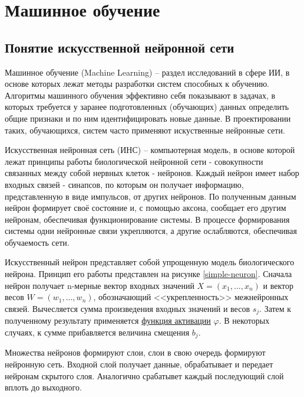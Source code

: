 \section{Машинное обучение}

\subsection{Понятие искусственной нейронной сети}

Машинное обучение (Machine Learning) – раздел исследований в сфере ИИ, в основе которых лежат методы разработки систем способных к обучению. Алгоритмы машинного обучения эффективно себя показывают в задачах, в которых требуется у заранее подготовленных (обучающих) данных определить общие признаки и по ним идентифицировать новые данные. В проектировании таких, обучающихся, систем часто применяют искуственные нейронные сети. 

Искусственная нейронная сеть (ИНС) – компьютерная модель, в основе которой лежат принципы работы биологической нейронной сети - совокупности связанных между собой нервных клеток - нейронов. Каждый нейрон имеет набор входных связей - синапсов, по которым он получает информацию, представленную в виде импульсов, от других нейронов. По полученным данным нейрон формирует своё состояние и, с помощью аксона, сообщает его другим нейронам, обеспечивая функционирование системы. В процессе формирования системы одни нейронные связи укрепляются, а другие ослабляются, обеспечивая обучаемость сети.

Искусственный нейрон представляет собой упрощенную модель биологического нейрона. Принцип его работы представлен на рисунке \ref{simple-neuron}. Сначала нейрон получает n-мерные вектор входных значений $X=(x_{1},...,x_{n})$ и вектор весов $W=(w_{1},...,w_{n})$, обозначающий <<укрепленность>> межнейронных связей. Вычесляется сумма произведения входных значений и весов $s_j$. Затем к полученному результату применяется \hyperref[sec:activation]{функция активации} $\varphi$. В некоторых случаях, к сумме прибавляется величина смещения $b_j$.


Множества нейронов формируют слои, слои в свою очередь формируют нейронную сеть. Входной слой получает данные, обрабатывает и передает нейронам скрытого слоя. Аналогично срабатывет каждый последующий слой вплоть до выходного. 


